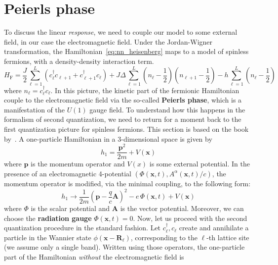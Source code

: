 \section{Peierls phase}
To discuss the linear \textit{response}, we need to couple our model to some external field, in our
case the electromagnetic field. Under the Jordan-Wigner transformation, the Hamiltonian~\eqref{eq:nn_heisenberg}
maps to a model of spinless fermions, with a density-density interaction term.
\begin{equation}
    H_{\text{F} } = \frac{J}{2}\sum_{\ell=1}^{L} \left( c_{\ell}^{\dagger} c_{\ell+1} + c_{\ell+1}^{\dagger} c_{\ell} \right)
    + J \Delta \sum_{\ell=1}^{L} \left(n_{\ell} - \frac{1}{2}\right)\left(n_{\ell+1}-\frac{1}{2}\right)
    - h \sum_{\ell=1}^{L} \left(n_{\ell} - \frac{1}{2}\right)
\end{equation}
where \(n_{\ell} = c^{\dag}_{\ell}c_{\ell}\).
In this picture, the kinetic part of the fermionic Hamiltonian couple to the electromagnetic field
via the so-called \textbf{Peierls phase}, which is a manifestation of the \(U(1)\) gauge field. To understand
how this happens in the formalism of second quantization, we need to return for a moment back to the
first quantization picture for spinless fermions. This section is based on the book by~\textcite{Essler2005}.
A one-particle Hamiltonian in a 3-dimensional space is given by
\begin{equation}
    h_{1} = \frac{\mathbf{p}^{2}}{2m} + V(\mathbf{x} )
\end{equation}
where \(\mathbf{p}\) is the momentum operator and \(V(x)\) is some external potential. In the presence of an
electromagnetic 4-potential \(\left(\Phi(\mathbf{x},t ), A^{\alpha }(\mathbf{x} ,t)/c\right)\),
the momentum operator is modified, via the minimal coupling, to the following form:
\begin{equation}
    h_{1} \to \frac{1}{2m}\left(\mathbf{p} - \frac{q}{c}\mathbf{A}\right)^{2} - e\,\Phi(\mathbf{x},t) + V(\mathbf{x} )
\end{equation}
where \(\Phi \) is the scalar potential and \(\mathbf{A}\) is the vector potential.
Moreover, we can choose the \textbf{radiation gauge} \(\Phi(\mathbf{x} ,t) = 0\).
Now, let us proceed with the second quantization procedure in the standard fashion. Let
\(c^{\dag}_{\ell},c_{\ell}\) create and annihilate a particle in the Wannier state \(\phi(\mathbf{x - \mathbf{R}_{\ell}})\),
corresponding to the \(\ell\)-th lattice site (we assume only a single band).
Written using those operators, the one-particle part of the Hamiltonian \textit{without} the electromagnetic field is
